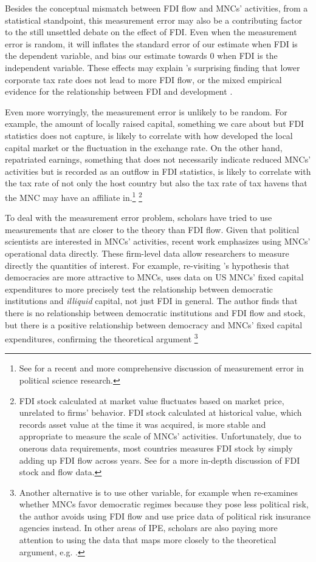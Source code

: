 Besides the conceptual mismatch between FDI flow and MNCs' activities, from a
statistical standpoint, this measurement error may also be a contributing factor
to the still unsettled debate on the effect of FDI. Even when the measurement
error is random, it will inflates the standard error of our estimate when FDI is
the dependent variable, and bias our estimate towards 0 when FDI is the
independent variable. These effects may explain \citet{Jensen2012}'s surprising
finding that lower corporate tax rate does not lead to more FDI flow, or the
mixed empirical evidence for the relationship between FDI and development
\citep[108]{Mold2004}.

Even more worryingly, the measurement error is unlikely to be random. For
example, the amount of locally raised capital, something we care about but FDI
statistics does not capture, is likely to correlate with how developed the local
capital market or the fluctuation in the exchange rate. On the other hand,
repatriated earnings, something that does not necessarily indicate reduced MNCs'
activities but is recorded as an outflow in FDI statistics, is likely to
correlate with the tax rate of not only the host country but also the tax rate
of tax havens that the MNC may have an affiliate in.\footnote{See
\citet{Gallop2017} for a recent and more comprehensive discussion of measurement
error in political science research.} \footnote{FDI stock calculated at market
value fluctuates based on market price, unrelated to firms' behavior. FDI stock
calculated at historical value, which records asset value at the time it was
acquired, is more stable and appropriate to measure the scale of MNCs'
activities. Unfortunately, due to onerous data requirements, most countries
measures FDI stock by simply adding up FDI flow across years. See
\citet[809]{Kerner2014} for a more in-depth discussion of FDI stock and flow
data.}

To deal with the measurement error problem, scholars have tried to use
measurements that are closer to the theory than FDI flow. Given that political
scientists are interested in MNCs' activities, recent work emphasizes using
MNCs' operational data directly. These firm-level data allow researchers to
measure directly the quantities of interest. For example, re-visiting
\citet{Li2009a}'s hypothesis that democracies are more attractive to MNCs,
\citet{Kerner2014} uses data on US MNCs' fixed capital expenditures to more
precisely test the relationship between democratic institutions and
\textit{illiquid} capital, not just FDI in general. The author finds that there
is no relationship between democratic institutions and FDI flow and stock, but
there is a positive relationship between democracy and MNCs' fixed capital
expenditures, confirming the theoretical argument \footnote{Another alternative
is to use other variable, for example when \citet{Jensen2008a} re-examines
whether MNCs favor democratic regimes because they pose less political risk, the
author avoids using FDI flow and use price data of political risk insurance
agencies instead. In other areas of IPE, scholars are also paying more attention
to using the data that maps more closely to the theoretical argument, e.g.
\citep{Karcher2013}.}

